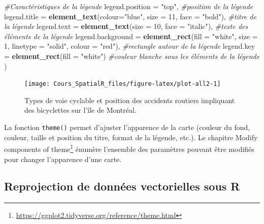 \documentclass[
  12pt,
]{krantz}
\newenvironment{Shaded}{\begin{snugshade}}{\end{snugshade}}
\newcommand{\CommentTok}[1]{\textcolor[rgb]{0.56,0.35,0.01}{\textit{#1}}}
\newcommand{\DataTypeTok}[1]{\textcolor[rgb]{0.13,0.29,0.53}{#1}}
\newcommand{\DecValTok}[1]{\textcolor[rgb]{0.00,0.00,0.81}{#1}}
\newcommand{\KeywordTok}[1]{\textcolor[rgb]{0.13,0.29,0.53}{\textbf{#1}}}
\newcommand{\NormalTok}[1]{#1}
\newcommand{\StringTok}[1]{\textcolor[rgb]{0.31,0.60,0.02}{#1}}
\renewcommand{\href}[2]{#2\footnote{\url{#1}}}
\begin{document}
\begin{Shaded}
\begin{Highlighting}[]
      \CommentTok{#Caractéristiques de la légende}
      \DataTypeTok{legend.position =} \StringTok{"top"}\NormalTok{,                         }\CommentTok{#position de la légende}
      \DataTypeTok{legend.title =} \KeywordTok{element_text}\NormalTok{(}\DataTypeTok{colour=}\StringTok{"blue"}\NormalTok{, }\DataTypeTok{size =} \DecValTok{11}\NormalTok{, }\DataTypeTok{face =} \StringTok{"bold"}\NormalTok{), }\CommentTok{#titre de la légende}
      \DataTypeTok{legend.text =} \KeywordTok{element_text}\NormalTok{(}\DataTypeTok{size =} \DecValTok{10}\NormalTok{, }\DataTypeTok{face =} \StringTok{"italic"}\NormalTok{),               }\CommentTok{#texte des éléments de la légende}
      \DataTypeTok{legend.background =} \KeywordTok{element_rect}\NormalTok{(}\DataTypeTok{fill =} \StringTok{"white"}\NormalTok{, }\DataTypeTok{size =} \DecValTok{1}\NormalTok{, }\DataTypeTok{linetype =} \StringTok{"solid"}\NormalTok{, }\DataTypeTok{colour =} \StringTok{"red"}\NormalTok{), }\CommentTok{#rectangle autour de la légende}
      \DataTypeTok{legend.key =} \KeywordTok{element_rect}\NormalTok{(}\DataTypeTok{fill =} \StringTok{"white"}\NormalTok{)        }\CommentTok{#couleur blanche sous les éléments de la légende}
\NormalTok{)}
\end{Highlighting}
\end{Shaded}

\begin{figure}

{\centering \texttt{[image: Cours\_SpatialR\_files/figure-latex/plot-all2-1]} 

}

\caption{Types de voie cyclable et position des accidents routiers impliquant des bicyclettes sur l'île de Montréal.}\label{fig:plot-all2}
\end{figure}

La fonction \texttt{theme()} permet d'ajuster l'apparence de la carte (couleur du fond, couleur, taille et position du titre, format de la légende, etc.). Le chapitre \href{https://ggplot2.tidyverse.org/reference/theme.html}{Modify components of theme} \citep{Wickham_ggplot2_2016} énumère l'ensemble des paramètres pouvant être modifiés pour changer l'apparence d'une carte.

\hypertarget{reprojection-de-donnuxe9es-vectorielles-sous-r}{%
\subsection{Reprojection de données vectorielles sous R}\label{reprojection-de-donnuxe9es-vectorielles-sous-r}}
\end{document}
